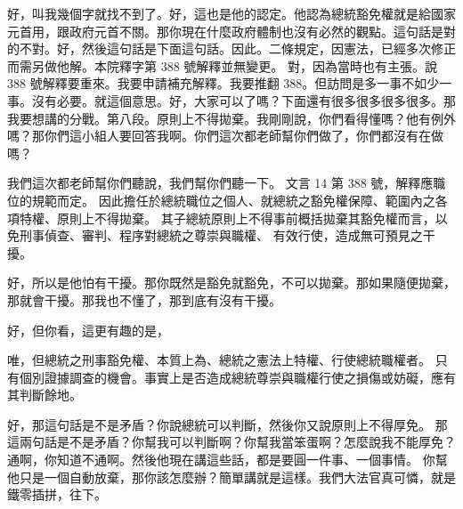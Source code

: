 \hypertarget{c11:cue:268}{}好，叫我幾個字就找不到了。好，這也是他的認定。他認為總統豁免權就是給國家元首用，跟政府元首不關。那你現在什麼政府體制也沒有必然的觀點。這句話是對的不對。好，然後這句話是下面這句話。因此。二條規定，因憲法，已經多次修正而需另做他解。本院釋字第 388 號解釋並無變更。
\hypertarget{c11:cue:269}{}對，因為當時也有主張。說 388 號解釋要重來。我要申請補充解釋。我要推翻 388。但訪問是多一事不如少一事。沒有必要。就這個意思。好，大家可以了嗎？下面還有很多很多很多很多。那我要想講的分戰。第八段。原則上不得拋棄。我剛剛說，你們看得懂嗎？他有例外嗎？那你們這小組人要回答我啊。你們這次都老師幫你們做了，你們都沒有在做嗎？

\hypertarget{c11:cue:270}{}我們這次都老師幫你們聽說，我們幫你們聽一下。
\hypertarget{c11:cue:271}{}文言 14 第 388 號，解釋應職位的規範而定。
\hypertarget{c11:cue:272}{}因此擔任於總統職位之個人、就總統之豁免權保障、範圍內之各項特權、原則上不得拋棄。
\hypertarget{c11:cue:273}{}其子總統原則上不得事前概括拋棄其豁免權而言，以免刑事偵查、審判、程序對總統之尊崇與職權、
\hypertarget{c11:cue:274}{}有效行使，造成無可預見之干擾。

\hypertarget{c11:cue:275}{}好，所以是他怕有干擾。那你既然是豁免就豁免，不可以拋棄。那如果隨便拋棄，那就會干擾。那我也不懂了，那到底有沒有干擾。

\hypertarget{c11:cue:276}{}好，但你看，這更有趣的是，\par{}唯，但總統之刑事豁免權、本質上為、總統之憲法上特權、行使總統職權者。
\hypertarget{c11:cue:277}{}只有個別證據調查的機會。事實上是否造成總統尊崇與職權行使之損傷或妨礙，應有其判斷餘地。

\hypertarget{c11:cue:278}{}好，那這句話是不是矛盾？你說總統可以判斷，然後你又說原則上不得厚免。
\hypertarget{c11:cue:279}{}那這兩句話是不是矛盾？你幫我可以判斷啊？你幫我當笨蛋啊？怎麼說我不能厚免？
\hypertarget{c11:cue:280}{}通啊，你知道不通啊。然後他現在講這些話，都是要圓一件事、一個事情。
\hypertarget{c11:cue:281}{}你幫他只是一個自動放棄，那你該怎麼辦？簡單講就是這樣。我們大法官真可憐，就是鐵零插拼，往下。

